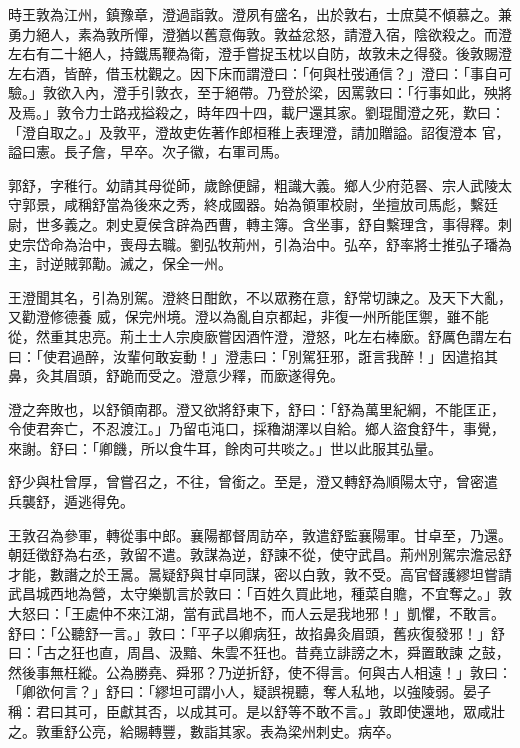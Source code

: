 \begin{pinyinscope}
 時王敦為江州，鎮豫章，澄過詣敦。澄夙有盛名，出於敦右，士庶莫不傾慕之。兼勇力絕人，素為敦所憚，澄猶以舊意侮敦。敦益忿怒，請澄入宿，陰欲殺之。而澄左右有二十絕人，持鐵馬鞭為衛，澄手嘗捉玉枕以自防，故敦未之得發。後敦賜澄左右酒，皆醉，借玉枕觀之。因下床而謂澄曰：「何與杜弢通信？」澄曰：「事自可驗。」敦欲入內，澄手引敦衣，至于絕帶。乃登於梁，因罵敦曰：「行事如此，殃將及焉。」敦令力士路戎搤殺之，時年四十四，載尸還其家。劉琨聞澄之死，歎曰：「澄自取之。」及敦平，澄故吏佐著作郎桓稚上表理澄，請加贈謚。詔復澄本
 官，謚曰憲。長子詹，早卒。次子徽，右軍司馬。



 郭舒，字稚行。幼請其母從師，歲餘便歸，粗識大義。鄉人少府范晷、宗人武陵太守郭景，咸稱舒當為後來之秀，終成國器。始為領軍校尉，坐擅放司馬彪，繫廷尉，世多義之。刺史夏侯含辟為西曹，轉主簿。含坐事，舒自繫理含，事得釋。刺史宗岱命為治中，喪母去職。劉弘牧荊州，引為治中。弘卒，舒率將士推弘子璠為主，討逆賊郭勱。滅之，保全一州。



 王澄聞其名，引為別駕。澄終日酣飲，不以眾務在意，舒常切諫之。及天下大亂，又勸澄修德養
 威，保完州境。澄以為亂自京都起，非復一州所能匡禦，雖不能從，然重其忠亮。荊土士人宗庾廞嘗因酒忤澄，澄怒，叱左右棒廞。舒厲色謂左右曰：「使君過醉，汝輩何敢妄動！」澄恚曰：「別駕狂邪，誑言我醉！」因遣掐其鼻，灸其眉頭，舒跪而受之。澄意少釋，而廞遂得免。



 澄之奔敗也，以舒領南郡。澄又欲將舒東下，舒曰：「舒為萬里紀綱，不能匡正，令使君奔亡，不忍渡江。」乃留屯沌口，採穭湖澤以自給。鄉人盜食舒牛，事覺，來謝。舒曰：「卿饑，所以食牛耳，餘肉可共啖之。」世以此服其弘量。



 舒少與杜曾厚，曾嘗召之，不往，曾銜之。至是，澄又轉舒為順陽太守，曾密遣
 兵襲舒，遁逃得免。



 王敦召為參軍，轉從事中郎。襄陽都督周訪卒，敦遣舒監襄陽軍。甘卓至，乃還。朝廷徵舒為右丞，敦留不遣。敦謀為逆，舒諫不從，使守武昌。荊州別駕宗澹忌舒才能，數譖之於王暠。暠疑舒與甘卓同謀，密以白敦，敦不受。高官督護繆坦嘗請武昌城西地為營，太守樂凱言於敦曰：「百姓久買此地，種菜自贍，不宜奪之。」敦大怒曰：「王處仲不來江湖，當有武昌地不，而人云是我地邪！」凱懼，不敢言。舒曰：「公聽舒一言。」敦曰：「平子以卿病狂，故掐鼻灸眉頭，舊疢復發邪！」舒曰：「古之狂也直，周昌、汲黯、朱雲不狂也。昔堯立誹謗之木，舜置敢諫
 之鼓，然後事無枉縱。公為勝堯、舜邪？乃逆折舒，使不得言。何與古人相遠！」敦曰：「卿欲何言？」舒曰：「繆坦可謂小人，疑誤視聽，奪人私地，以強陵弱。晏子稱：君曰其可，臣獻其否，以成其可。是以舒等不敢不言。」敦即使還地，眾咸壯之。敦重舒公亮，給賜轉豐，數詣其家。表為梁州刺史。病卒。




\end{pinyinscope}
